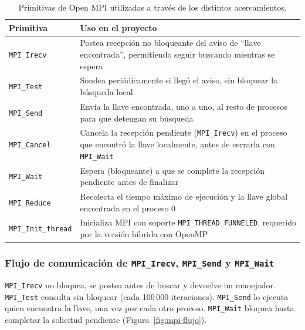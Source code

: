 \documentclass[11pt,letterpaper]{article}
\begin{document}
\begin{table}[H]
\centering
\small
\begin{tabular}{p{3.2cm}p{10.5cm}}
\toprule
\textbf{Primitiva} & \textbf{Uso en el proyecto} \\
\midrule
\texttt{MPI\_Irecv} & Postea recepción no bloqueante del aviso de ``llave encontrada'', permitiendo seguir buscando mientras se espera \\
\texttt{MPI\_Test} & Sondea periódicamente si llegó el aviso, sin bloquear la búsqueda local \\
\texttt{MPI\_Send} & Envía la llave encontrada, uno a uno, al resto de procesos para que detengan su búsqueda \\
\texttt{MPI\_Cancel} & Cancela la recepción pendiente (\texttt{MPI\_Irecv}) en el proceso que encontró la llave localmente, antes de cerrarla con \texttt{MPI\_Wait} \\
\texttt{MPI\_Wait} & Espera (bloqueante) a que se complete la recepción pendiente antes de finalizar \\
\texttt{MPI\_Reduce} & Recolecta el tiempo máximo de ejecución y la llave global encontrada en el proceso 0 \\
\texttt{MPI\_Init\_thread} & Inicializa MPI con soporte \texttt{MPI\_THREAD\_FUNNELED}, requerido por la versión híbrida con OpenMP \\
\bottomrule
\end{tabular}
\caption{Primitivas de Open MPI utilizadas a través de los distintos acercamientos.}
\end{table}

\subsubsection*{Flujo de comunicación de \texttt{MPI\_Irecv}, \texttt{MPI\_Send} y \texttt{MPI\_Wait}}

\texttt{MPI\_Irecv} no bloquea, se postea antes de buscar y devuelve un manejador. \texttt{MPI\_Test} consulta sin bloquear (cada 100\,000 iteraciones). \texttt{MPI\_Send} lo ejecuta quien encuentra la llave, una vez por cada otro proceso. \texttt{MPI\_Wait} bloquea hasta completar la solicitud pendiente (Figura~\ref{fig:mpi-flujo}).
\end{document}
